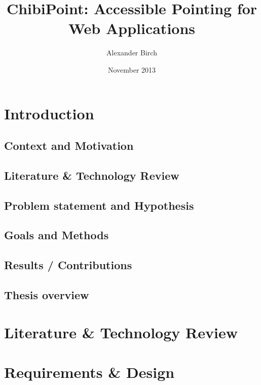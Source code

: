 \documentclass[a4paper, 12pt]{report}
\title{ChibiPoint: Accessible Pointing for Web Applications}
\author{Alexander Birch}
\date{November 2013}
\begin{document}

\maketitle
\tableofcontents


\chapter{Introduction}

\section{Context and Motivation}
\section{Literature \& Technology Review}
\section{Problem statement and Hypothesis}
\section{Goals and Methods}
\section{Results / Contributions}
\section{Thesis overview}

\chapter{Literature \& Technology Review}

\chapter{Requirements \& Design}
\end{document}
